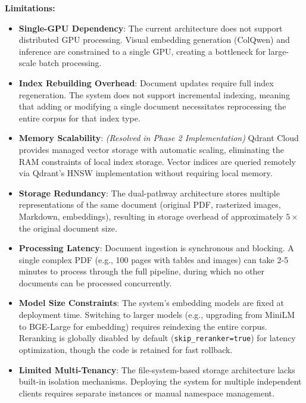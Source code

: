 \textbf{Limitations:}
\begin{itemize}
    \item \textbf{Single-GPU Dependency}: The current architecture does not support distributed GPU processing. Visual embedding generation (ColQwen) and inference are constrained to a single GPU, creating a bottleneck for large-scale batch processing.
    \item \textbf{Index Rebuilding Overhead}: Document updates require full index regeneration. The system does not support incremental indexing, meaning that adding or modifying a single document necessitates reprocessing the entire corpus for that index type.
    \item \textbf{Memory Scalability}: \textit{(Resolved in Phase 2 Implementation)} Qdrant Cloud provides managed vector storage with automatic scaling, eliminating the RAM constraints of local index storage. Vector indices are queried remotely via Qdrant's HNSW implementation without requiring local memory.
    \item \textbf{Storage Redundancy}: The dual-pathway architecture stores multiple representations of the same document (original PDF, rasterized images, Markdown, embeddings), resulting in storage overhead of approximately $5\times$ the original document size.
    \item \textbf{Processing Latency}: Document ingestion is synchronous and blocking. A single complex PDF (e.g., 100 pages with tables and images) can take 2-5 minutes to process through the full pipeline, during which no other documents can be processed concurrently.
    \item \textbf{Model Size Constraints}: The system's embedding models are fixed at deployment time. Switching to larger models (e.g., upgrading from MiniLM to BGE-Large for embedding) requires reindexing the entire corpus. Reranking is globally disabled by default (\texttt{skip\_reranker=true}) for latency optimization, though the code is retained for fast rollback.
    \item \textbf{Limited Multi-Tenancy}: The file-system-based storage architecture lacks built-in isolation mechanisms. Deploying the system for multiple independent clients requires separate instances or manual namespace management.
\end{itemize}